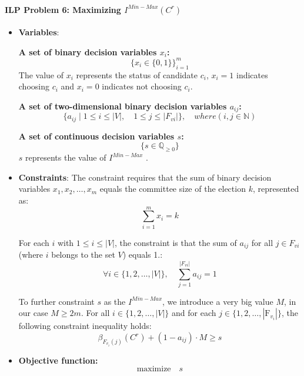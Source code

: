 \documentclass{article}
\begin{document}
\paragraph*{ILP Problem 6: Maximizing  $I^{Min-Max}(C^{r})$}

\begin{itemize}

  \item \textbf{Variables}: 

\textbf{A set of binary decision variables $x_i$:} \[ \bigg\{ x_i \in \{0, 1\} \bigg\}_{i=1}^m \] The value of $x_i$ represents the status of candidate $c_i$, \(x_i = 1\) indicates choosing $c_i$ and \(x_i = 0\) indicates not choosing $c_i$.


\textbf{A set of two-dimensional binary decision variables \( a_{ij} \):}
\[
\{ a_{ij} \mid 1 \leq i \leq |V|, \quad 1 \leq j \leq |F_{vi}| \},\quad where  (i, j \in \mathbb{N})
\]

\textbf{A set of continuous decision variables $s$:} 
\[ \bigg\{ s \in \mathbb{Q}_{\geq 0} \bigg\} \] 
$s$ represents the value of $I^{Min-Max}$ .
    \item \textbf{Constraints}:
The constraint requires that the sum of binary decision variables \(x_1, x_2, \ldots, x_m\) equals the committee size of the election \(k\), represented as:
\begin{equation} \sum_{i=1}^m x_i = k  \label{eq:ilpminmax1}
\end{equation}

For each \(i\) with \(1 \leq i \leq |V|\), the constraint is that the sum of \( a_{ij} \) for all \( j \in F_{vi} \) (where \( i \) belongs to the set \( V \)) equals 1.:
\begin{equation} \forall i \in \{1, 2, \ldots, |V|\}, \quad \sum_{j=1}^{|F_{vi}|} a_{ij} = 1  \label{eq:ilpminmax2}
\end{equation}

To further constraint $s$ as the $I^{Min-Max}$, we introduce a very big value $M$, in our case $M \geq  2m$. For all \( i \in \{1, 2, \ldots, |V|\} \) and for each  \( j \in \{1, 2, \ldots, |\text{F}_{v_i}|\} \), the following constraint inequality holds:
\begin{equation} \beta_{F_{v_i}(j)}(C^{r}) + (1 - a_{ij})\cdot M \geq s     \label{eq:ilpminmax3}
\end{equation}
  
  \item  \textbf{Objective function:}
  \[\text{maximize} \quad s \]


\end{itemize}
\end{document}
